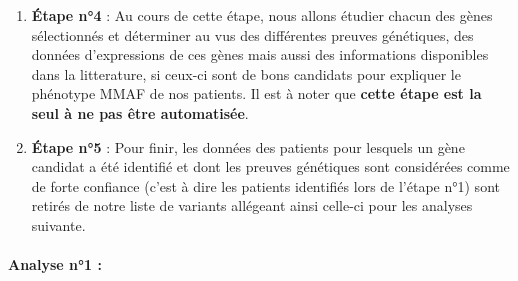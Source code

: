 \documentclass[12pt,twoside]{reedthesis}
\theoremstyle{definition}
\theoremstyle{definition}
\theoremstyle{remark}
\begin{document}
  \begin{enumerate}
  \def\labelenumi{\arabic{enumi}.}
  \setcounter{enumi}{3}
  \item
    \textbf{Étape n°4} : Au cours de cette étape, nous allons étudier
    chacun des gènes sélectionnés et déterminer au vus des différentes
    preuves génétiques, des données d'expressions de ces gènes mais aussi
    des informations disponibles dans la litterature, si ceux-ci sont de
    bons candidats pour expliquer le phénotype MMAF de nos patients. Il
    est à noter que \textbf{cette étape est la seul à ne pas être
    automatisée}.
  \item
    \textbf{Étape n°5} : Pour finir, les données des patients pour
    lesquels un gène candidat a été identifié et dont les preuves
    génétiques sont considérées comme de forte confiance (c'est à dire les
    patients identifiés lors de l'étape n°1) sont retirés de notre liste
    de variants allégeant ainsi celle-ci pour les analyses suivante.
  \end{enumerate}
  
  \newpage  
  
  \paragraph{Analyse n°1 :}\label{analyse-n1}
  
\end{document}

